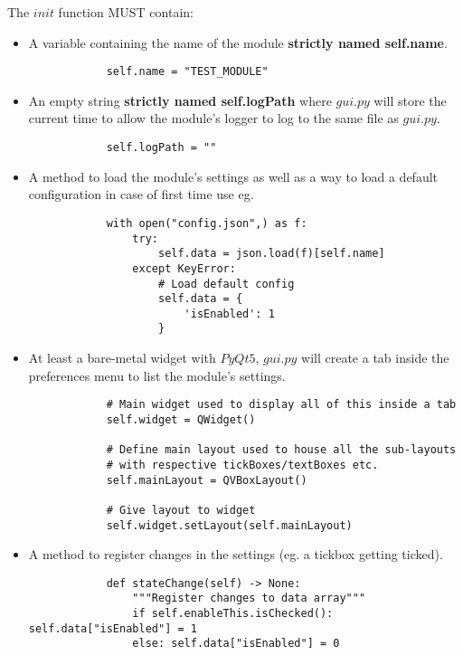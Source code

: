\documentclass{article}
\begin{document}
    The $init$ function MUST contain:
    \begin{itemize}
        \item A variable containing the name of the module \textbf{strictly named self.name}.
        \begin{verbatim}
            self.name = "TEST_MODULE"
        \end{verbatim}
        \item An empty string \textbf{strictly named self.logPath} where $gui.py$ will store the current time to allow the module's logger to log to the same file as $gui.py$.
        \begin{verbatim}
            self.logPath = ""
        \end{verbatim}
        \item A method to load the module's settings as well as a way to load a default configuration in case of first time use eg.
        \begin{verbatim}
            with open("config.json",) as f:
                try:
                    self.data = json.load(f)[self.name]
                except KeyError:
                    # Load default config
                    self.data = {
                        'isEnabled': 1
                    }
        \end{verbatim}
        \item At least a bare-metal widget with $PyQt5$, $gui.py$ will create a tab inside the preferences menu to list the module's settings.
        \begin{verbatim}
            # Main widget used to display all of this inside a tab
            self.widget = QWidget()

            # Define main layout used to house all the sub-layouts 
            # with respective tickBoxes/textBoxes etc.
            self.mainLayout = QVBoxLayout()

            # Give layout to widget
            self.widget.setLayout(self.mainLayout)            
        \end{verbatim}
        \item A method to register changes in the settings (eg. a tickbox getting ticked).
        \begin{verbatim}
            def stateChange(self) -> None:
                """Register changes to data array"""
                if self.enableThis.isChecked(): self.data["isEnabled"] = 1
                else: self.data["isEnabled"] = 0
        \end{verbatim}
        
    \end{itemize}
\end{document}
